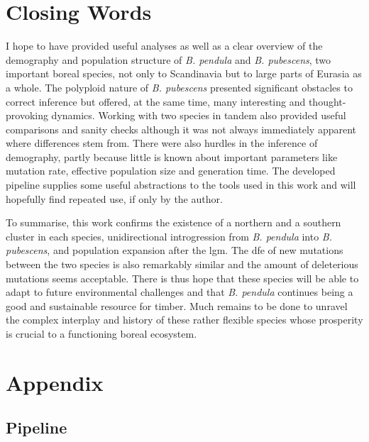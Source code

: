 \documentclass[hidelinks,11pt]{article}
\newcommand{\pendula}{\textit{B. pendula}}
\newcommand{\pubescens}{\textit{B. pubescens}}
\begin{document}
    \clearpage


    \section{Closing Words}

    I hope to have provided useful analyses as well as a clear overview of the demography and population structure of \pendula{} and \pubescens{}, two important boreal species, not only to Scandinavia but to large parts of Eurasia as a whole. The polyploid nature of \pubescens{} presented significant obstacles to correct inference but offered, at the same time, many interesting and thought-provoking dynamics. Working with two species in tandem also provided useful comparisons and sanity checks although it was not always immediately apparent where differences stem from. There were also hurdles in the inference of demography, partly because little is known about important parameters like mutation rate, effective population size and generation time. The developed pipeline supplies some useful abstractions to the tools used in this work and will hopefully find repeated use, if only by the author.

    To summarise, this work confirms the existence of a northern and a southern cluster in each species, unidirectional introgression from \pendula{} into \pubescens{}, and population expansion after the \acrshort{lgm}. The \acrshort{dfe} of new mutations between the two species is also remarkably similar and the amount of deleterious mutations seems acceptable. There is thus hope that these species will be able to adapt to future environmental challenges and that \pendula{} continues being a good and sustainable resource for timber. Much remains to be done to unravel the complex interplay and history of these rather flexible species whose prosperity is crucial to a functioning boreal ecosystem.

    \clearpage

    

    \clearpage


    \section{Appendix}
    \label{sec:appendix}

    \subsection{Pipeline}
    \label{sec:appendix-pipeline}
\end{document}
